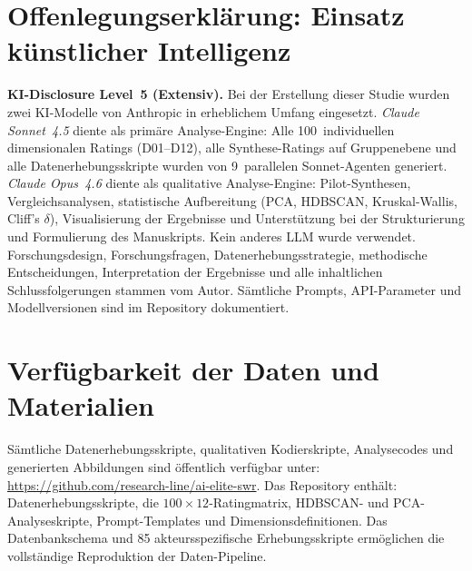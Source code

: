 \documentclass[12pt,a4paper]{article}
\begin{document}
\section*{Offenlegungserkl\"arung: Einsatz k\"unstlicher Intelligenz}

\noindent\textbf{KI-Disclosure Level~5 (Extensiv).}
Bei der Erstellung dieser Studie wurden zwei KI-Modelle von Anthropic in erheblichem Umfang eingesetzt. \emph{Claude Sonnet~4.5} diente als prim\"are Analyse-Engine: Alle 100~individuellen dimensionalen Ratings (D01--D12), alle Synthese-Ratings auf Gruppenebene und alle Datenerhebungsskripte wurden von 9~parallelen Sonnet-Agenten generiert. \emph{Claude Opus~4.6} diente als qualitative Analyse-Engine: Pilot-Synthesen, Vergleichsanalysen, statistische Aufbereitung (PCA, HDBSCAN, Kruskal-Wallis, Cliff's $\delta$), Visualisierung der Ergebnisse und Unterst\"utzung bei der Strukturierung und Formulierung des Manuskripts. Kein anderes LLM wurde verwendet. Forschungsdesign, Forschungsfragen, Datenerhebungsstrategie, methodische Entscheidungen, Interpretation der Ergebnisse und alle inhaltlichen Schlussfolgerungen stammen vom Autor. S\"amtliche Prompts, API-Parameter und Modellversionen sind im Repository dokumentiert.



\section*{Verf\"ugbarkeit der Daten und Materialien}

\noindent S\"amtliche Datenerhebungsskripte, qualitativen Kodierskripte, Analysecodes und generierten Abbildungen sind \"offentlich verf\"ugbar unter: \url{https://github.com/research-line/ai-elite-swr}. Das Repository enth\"alt: Datenerhebungsskripte, die $100 \times 12$-Ratingmatrix, HDBSCAN- und PCA-Analyseskripte, Prompt-Templates und Dimensionsdefinitionen. Das Datenbankschema und 85 akteursspezifische Erhebungsskripte erm\"oglichen die vollst\"andige Reproduktion der Daten-Pipeline.

\newpage
\end{document}
